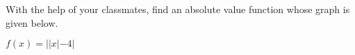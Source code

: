 {With the help of your classmates, find an absolute value function whose graph is given below.

\begin{center}
\end{center}}
{$f(x) = ||x| - 4|$}